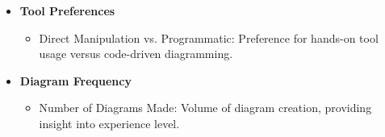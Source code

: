 \begin{itemize}
    \item \textbf{Tool Preferences}
    \begin{itemize}
        \item Direct Manipulation vs. Programmatic: Preference for hands-on tool usage versus code-driven diagramming.
    \end{itemize}

    \item \textbf{Diagram Frequency}
    \begin{itemize}
        \item Number of Diagrams Made: Volume of diagram creation, providing insight into experience level.
    \end{itemize}
\end{itemize}
